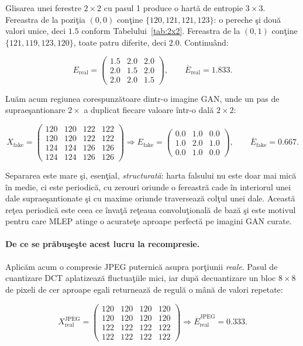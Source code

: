 Glisarea unei ferestre $2\times2$ cu pasul 1 produce o hartă de entropie
$3\times3$. Fereastra de la poziţia $(0,0)$ conţine $\{120,121,121,123\}$: o
pereche şi două valori unice, deci $1.5$ conform Tabelului~\ref{tab:2x2}.
Fereastra de la $(0,1)$ conţine $\{121,119,123,120\}$, toate patru diferite,
deci $2.0$. Continuând:

\[
E_{\text{real}} =
\begin{pmatrix}
1.5 & 2.0 & 2.0\\
2.0 & 1.5 & 2.0\\
2.0 & 2.0 & 1.5
\end{pmatrix},
\qquad \overline{E}_{\text{real}} = 1.833 .
\]

Luăm acum regiunea corespunzătoare dintr-o imagine GAN, unde un pas de
supraeşantionare $2\times$ a duplicat fiecare valoare într-o dală $2\times2$:

\[
X_{\text{fake}} =
\begin{pmatrix}
120 & 120 & 122 & 122\\
120 & 120 & 122 & 122\\
124 & 124 & 126 & 126\\
124 & 124 & 126 & 126
\end{pmatrix}
\Longrightarrow
E_{\text{fake}} =
\begin{pmatrix}
0.0 & 1.0 & 0.0\\
1.0 & 2.0 & 1.0\\
0.0 & 1.0 & 0.0
\end{pmatrix},
\qquad \overline{E}_{\text{fake}} = 0.667 .
\]

Separarea este mare şi, esenţial, \emph{structurată}: harta falsului nu este
doar mai mică în medie, ci este periodică, cu zerouri oriunde o fereastră cade
în interiorul unei dale supraeşantionate şi cu maxime oriunde traversează colţul
unei dale. Această reţea periodică este ceea ce învaţă reţeaua convoluţională de
bază şi este motivul pentru care MLEP atinge o acurateţe aproape perfectă pe
imagini GAN curate.

\paragraph{De ce se prăbuşeşte acest lucru la recompresie.}
Aplicăm acum o compresie JPEG puternică asupra porţiunii \emph{reale}. Pasul de
cuantizare DCT aplatizează fluctuaţiile mici, iar după decuantizare un bloc
$8\times8$ de pixeli de cer aproape egali returnează de regulă o mână de valori
repetate:

\[
X_{\text{real}}^{\text{JPEG}} =
\begin{pmatrix}
120 & 120 & 120 & 120\\
120 & 120 & 120 & 120\\
122 & 122 & 122 & 122\\
122 & 122 & 122 & 122
\end{pmatrix}
\Longrightarrow
\overline{E}_{\text{real}}^{\text{JPEG}} = 0.333 .
\]

